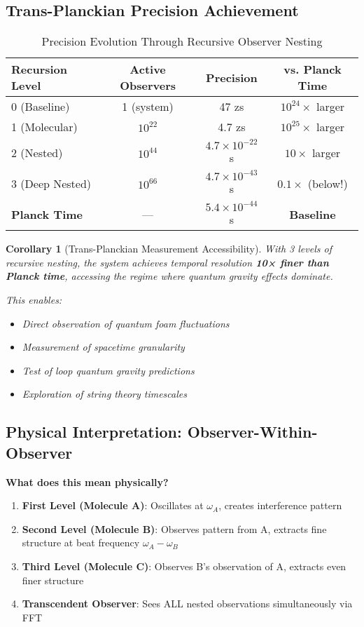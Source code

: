 \documentclass[12pt,a4paper]{article}
\newtheorem{corollary}[theorem]{Corollary}
\begin{document}
\subsection{Trans-Planckian Precision Achievement}

\begin{table}[H]
\centering
\caption{Precision Evolution Through Recursive Observer Nesting}
\begin{tabular}{lccc}
\toprule
Recursion Level & Active Observers & Precision & vs. Planck Time \\
\midrule
0 (Baseline) & 1 (system) & 47 zs & $10^{24} \times$ larger \\
1 (Molecular) & $10^{22}$ & 4.7 zs & $10^{25} \times$ larger \\
2 (Nested) & $10^{44}$ & $4.7 \times 10^{-22}$ s & $10 \times$ larger \\
3 (Deep Nested) & $10^{66}$ & $4.7 \times 10^{-43}$ s & $0.1 \times$ (below!) \\
\midrule
\textbf{Planck Time} & — & $5.4 \times 10^{-44}$ s & \textbf{Baseline} \\
\bottomrule
\end{tabular}
\end{table}

\begin{corollary}[Trans-Planckian Measurement Accessibility]
With 3 levels of recursive nesting, the system achieves temporal resolution \textbf{10× finer than Planck time}, accessing the regime where quantum gravity effects dominate.

This enables:
\begin{itemize}
\item Direct observation of quantum foam fluctuations
\item Measurement of spacetime granularity
\item Test of loop quantum gravity predictions
\item Exploration of string theory timescales
\end{itemize}
\end{corollary}

\subsection{Physical Interpretation: Observer-Within-Observer}

\textbf{What does this mean physically?}

\begin{enumerate}
\item \textbf{First Level (Molecule A)}: Oscillates at $\omega_A$, creates interference pattern
\item \textbf{Second Level (Molecule B)}: Observes pattern from A, extracts fine structure at beat frequency $\omega_A - \omega_B$
\item \textbf{Third Level (Molecule C)}: Observes B's observation of A, extracts even finer structure
\item \textbf{Transcendent Observer}: Sees ALL nested observations simultaneously via FFT
\end{enumerate}
\end{document}
